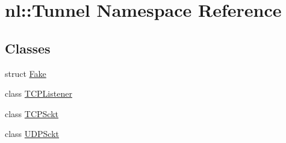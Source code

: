 \hypertarget{namespacenl_1_1Tunnel}{}\section{nl\+:\+:Tunnel Namespace Reference}
\label{namespacenl_1_1Tunnel}
\subsection*{Classes}
\begin{DoxyCompactItemize}
\item 
struct \hyperlink{structnl_1_1Tunnel_1_1Fake}{Fake}
\item 
class \hyperlink{classnl_1_1Tunnel_1_1TCPListener}{T\+C\+P\+Listener}
\item 
class \hyperlink{classnl_1_1Tunnel_1_1TCPSckt}{T\+C\+P\+Sckt}
\item 
class \hyperlink{classnl_1_1Tunnel_1_1UDPSckt}{U\+D\+P\+Sckt}
\end{DoxyCompactItemize}
